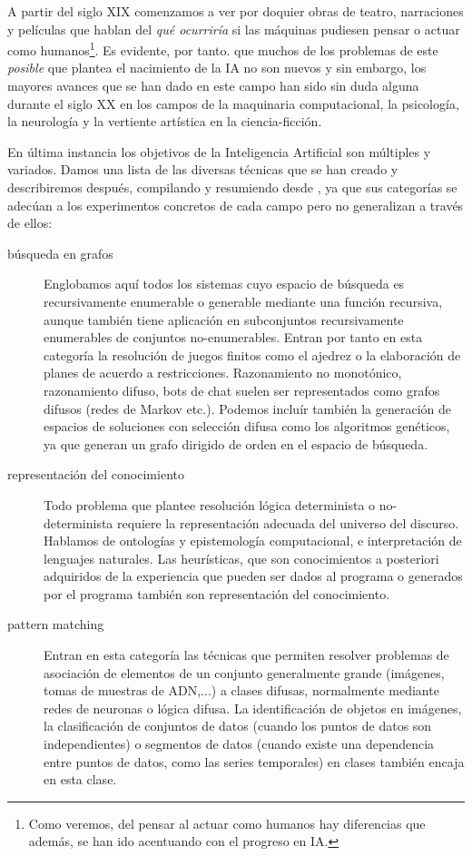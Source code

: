 \documentclass[12pt]{memoir}
\begin{document}
A partir del siglo XIX comenzamos a ver por doquier obras de teatro, narraciones y películas que hablan del \textit{qué ocurriría} si las máquinas pudiesen pensar o actuar como humanos\footnote{Como veremos, del pensar al actuar como humanos hay diferencias que además, se han ido acentuando con el progreso en IA.}. Es evidente, por tanto. que muchos de los problemas de este \textit{posible} que plantea el nacimiento de la IA no son nuevos y sin embargo, los mayores avances que se han dado en este campo han sido sin duda alguna durante el siglo XX en los campos de la maquinaria computacional, la psicología, la neurología y la vertiente artística en la ciencia-ficción.

En última instancia los objetivos de la Inteligencia Artificial son múltiples y variados. Damos una lista de las diversas técnicas que se han creado y describiremos después, compilando y resumiendo desde \cite{mcarthy2007}, ya que sus categorías se adecúan a los experimentos concretos de cada campo pero no generalizan a través de ellos:

\begin{description}
	\item[búsqueda en grafos] Englobamos aquí todos los sistemas cuyo espacio de búsqueda es recursivamente enumerable o generable mediante una función recursiva, aunque también tiene aplicación en subconjuntos recursivamente enumerables de conjuntos no-enumerables. Entran por tanto en esta categoría la resolución de juegos finitos como el ajedrez o la elaboración de planes de acuerdo a restricciones. Razonamiento no monotónico, razonamiento difuso, bots de chat suelen ser representados como grafos difusos (redes de Markov etc.). Podemos incluír también la generación de espacios de soluciones con selección difusa como los algoritmos genéticos, ya que generan un grafo dirigido de orden en el espacio de búsqueda.
\end{description}
\begin{description}
	\item[representación del conocimiento] Todo problema que plantee resolución lógica determinista o no-determinista requiere la representación adecuada del universo del discurso. Hablamos de ontologías y epistemología computacional, e interpretación de lenguajes naturales. Las heurísticas, que son conocimientos a posteriori adquiridos de la experiencia que pueden ser dados al programa o generados por el programa también son representación del conocimiento.
\end{description}
\begin{description}
	\item[pattern matching] Entran en esta categoría las técnicas que permiten resolver problemas de asociación de elementos de un conjunto generalmente grande (imágenes, tomas de muestras de ADN,...) a clases difusas, normalmente mediante redes de neuronas o lógica difusa. La identificación de objetos en imágenes, la clasificación de conjuntos de datos (cuando los puntos de datos son independientes) o segmentos de datos (cuando existe una dependencia entre puntos de datos, como las series temporales) en clases también encaja en esta clase.
\end{description}
\end{document}
